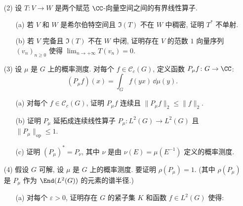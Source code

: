 \begin{enumerate}
\begin{enumerate}
\begin{itemize}
    \item 对每个 $x \in G$, $\int_H\theta(xy)\,\dd\mu_H(y) = 1$.
    \end{itemize}
    (提示: 取 (a) 中的 $T$, 其中 $U$ 相对紧, 取满足 $\phi|_U = 1$ 的 $\phi \in \mathcal{C}_c^+(G)$, 定义 $\psi(x) = \sum_{t \in T}\phi(xg_t^{-1})$, 其中 $g_t \in G$ 是 $t$ 的提升, 然后稍微修改 $\psi$.)
  \item[(c)] 对每个 $\phi \in L^{\infty}(H)$, 定义 $\phi_{\theta} \colon G \to \CC$:
    \[
    \phi_{\theta}(x) = \int_H\phi(y)\theta(x^{-1}y)\,\dd\mu_H(y).
    \]
    证明 $\phi_{\theta} \in L^{\infty}(G)$.
  \item[(d)] 若 $M$ 是 $L^{\infty}(G)$ 上被 $H$ 左不变的平均, 证明 $\phi \longmapsto M(\phi_{\theta})$ 是 $L^{\infty}(H)$ 上的左不变平均.
  \end{enumerate}
\item[(2)] 设 $T \colon V \to W$ 是两个赋范 $\CC$-向量空间之间的有界线性算子.
  \begin{enumerate}
  \item[(a)] 若 $V$ 和 $W$ 是希尔伯特空间且 $\Im(T)$ 不在 $W$ 中稠密, 证明 $T^*$ 不单射.
  \item[(b)] 若 $V$ 完备且 $\Im(T)$ 不在 $W$ 中闭, 证明存在 $V$ 的范数 $1$ 向量序列 $(v_n)_{n \geq 0}$ 使得 $\lim_{n \to +\infty}T(v_n) = 0$.
  \end{enumerate}
\item[(3)] 设 $\mu$ 是 $G$ 上的概率测度. 对每个 $f \in \mathcal{C}_c(G)$, 定义函数 $P_{\mu}f \colon G \to \CC$:
    \[
    (P_{\mu}f)(x) = \int_G f(yx)\,\dd\mu(y).
    \]
  \begin{enumerate}
  \item[(a)] 对每个 $f \in \mathcal{C}_c(G)$, 证明 $P_{\mu}f$ 连续且 $\|P_{\mu}f\|_2 \leq \|f\|_2$.
  \item[(b)] 证明 $P_{\mu}$ 延拓成连续线性算子 $P_{\mu} \colon L^2(G) \to L^2(G)$ 且 $\|P_{\mu}\|_{\mathrm{op}} \leq 1$.
  \item[(c)] 证明 $(P_{\mu})^* = P_{\nu}$, 其中 $\nu$ 是由 $\nu(E) = \mu(E^{-1})$ 定义的概率测度.
  \end{enumerate}
\item[(4)] 假设 $G$ 可解, 设 $\mu$ 是 $G$ 上的概率测度. 要证明 $\rho(P_{\mu}) = 1$. (其中 $\rho(P_{\mu})$ 是 $P_{\mu}$ 作为 $\End(L^2(G))$ 的元素的谱半径.)
  \begin{enumerate}
  \item[(a)] 对每个 $\varepsilon > 0$, 证明存在 $G$ 的紧子集 $K$ 和函数 $f \in L^2(G)$ 使得:
    \begin{itemize}

\end{itemize}
\end{enumerate}
\end{enumerate}
